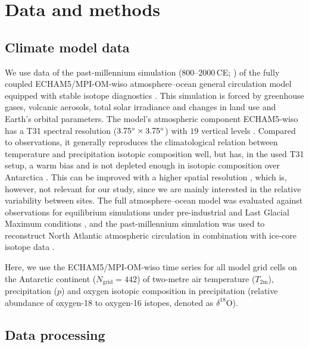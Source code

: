 \documentclass[cp, manuscript]{copernicus}
\begin{document}
\section{Data and methods}\label{methods}

\subsection{Climate model data}\label{methods:data}

We use data of the past-millennium simulation (800--2000\,CE;
\citealp{Sjolte2018}) of the fully coupled ECHAM5/MPI-OM-wiso atmosphere--ocean
general circulation model equipped with stable isotope diagnostics
\citep{Werner2016}. This simulation is forced by greenhouse gases, volcanic
aerosols, total solar irradiance and changes in land use and Earth's orbital
parameters. The model's atmospheric component ECHAM5-wiso has a T31 spectral
resolution ($3.75^{\circ}\times3.75^{\circ}$) with $19$ vertical levels
\citep{Sjolte2018}. Compared to observations, it generally reproduces the
climatological relation between temperature and precipitation isotopic
composition well, but has, in the used T31 setup, a warm bias and is not
depleted enough in isotopic composition over Antarctica \citep{Werner2011}. This
can be improved with a higher spatial resolution \citep{Werner2011}, which is,
however, not relevant for our study, since we are mainly interested in the
relative variability between sites. The full atmosphere--ocean model was
evaluated against observations for equilibrium simulations under pre-industrial
and Last Glacial Maximum conditions \citep{Werner2016}, and the past-millennium
simulation was used to reconstruct North Atlantic atmospheric circulation in
combination with ice-core isotope data \citep{Sjolte2018}.

Here, we use the ECHAM5/MPI-OM-wiso time series for all model grid cells
on the Antarctic continent ($N_{\mathrm{grid}}=442$) of two-metre air
temperature ($T_{2\mathrm{m}}$), precipitation ($p$) and oxygen isotopic
composition in precipitation (relative abundance of oxygen-18 to oxygen-16
istopes, denoted as $\delta^{18}\mathrm{O}$).

\subsection{Data processing}\label{methods:prc}
\end{document}
